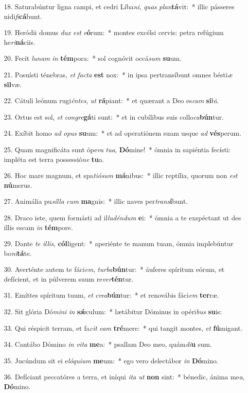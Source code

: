 18. Saturabúntur ligna campi, et cedri Líba\textit{ni}, \textit{quas} \textit{plan}\textbf{tá}vit:~*  illic pásseres nidi\textit{fi}\textbf{cá}bunt.\

19. Heródii domus \textit{dux} \textit{est} \textit{e}\textbf{ó}rum:~*  montes excélsi cervis: petra refúgium he\textit{ri}\textbf{ná}ciis.\

20. Fecit \textit{lu}\textit{nam} \textit{in} \textbf{tém}pora:~*  sol cognóvit occá\textit{sum} \textbf{su}um.\

21. Posuísti ténebras, \textit{et} \textit{fac}\textit{ta} \textbf{est} nox:~*  in ipsa pertransíbunt omnes bésti\textit{æ} \textbf{sil}væ.\

22. Cátuli leónum rugi\textit{én}\textit{tes}, \textit{ut} \textbf{rá}piant:~*  et quærant a Deo es\textit{cam} \textbf{si}bi.\

23. Ortus est sol, \textit{et} \textit{con}\textit{gre}\textbf{gá}ti sunt:~*  et in cubílibus suis collo\textit{ca}\textbf{bún}tur.\

24. Exíbit homo \textit{ad} \textit{o}\textit{pus} \textbf{su}um:~*  et ad operatiónem suam usque \textit{ad} \textbf{vés}perum.\

25. Quam magnificáta sunt ópe\textit{ra} \textit{tu}\textit{a}, \textbf{Dó}mine!~*  ómnia in sapiéntia fecísti: impléta est terra possessió\textit{ne} \textbf{tu}a.\

26. Hoc mare magnum, et spa\textit{ti}\textit{ó}\textit{sum} \textbf{má}nibus:~*  illic reptília, quorum non \textit{est} \textbf{nú}merus.\

27. Animália pu\textit{síl}\textit{la} \textit{cum} \textbf{ma}gnis:~*  illic naves per\textit{trans}\textbf{í}bunt.\

28. Draco iste, quem formásti ad il\textit{lu}\textit{dén}\textit{dum} \textbf{e}i:~*  ómnia a te exspéctant ut des illis escam \textit{in} \textbf{tém}pore.\

29. Dante \textit{te} \textit{il}\textit{lis}, \textbf{cól}ligent:~*  aperiénte te manum tuam, ómnia implebúntur bo\textit{ni}\textbf{tá}te.\

30. Averténte autem te fáci\textit{em}, \textit{tur}\textit{ba}\textbf{bún}tur:~*  áuferes spíritum eórum, et defícient, et in púlverem suum re\textit{ver}\textbf{tén}tur.\

31. Emíttes spíritum tuum, \textit{et} \textit{cre}\textit{a}\textbf{bún}tur:~*  et renovábis fáci\textit{em} \textbf{ter}ræ.\

32. Sit glória Dó\textit{mi}\textit{ni} \textit{in} \textbf{sǽ}culum:~*  lætábitur Dóminus in opéri\textit{bus} \textbf{su}is:\

33. Qui réspicit terram, et fa\textit{cit} \textit{e}\textit{am} \textbf{tré}mere:~*  qui tangit montes, \textit{et} \textbf{fú}migant.\

34. Cantábo Dómino \textit{in} \textit{vi}\textit{ta} \textbf{me}a:~*  psallam Deo meo, quám\textit{di}\textbf{u} sum.\

35. Jucúndum sit ei e\textit{ló}\textit{qui}\textit{um} \textbf{me}um:~*  ego vero delectábor \textit{in} \textbf{Dó}mino.\

36. Defíciant peccatóres a terra, et iníqui \textit{i}\textit{ta} \textit{ut} \textbf{non} sint:~*  bénedic, ánima me\textit{a}, \textbf{Dó}mino.\

